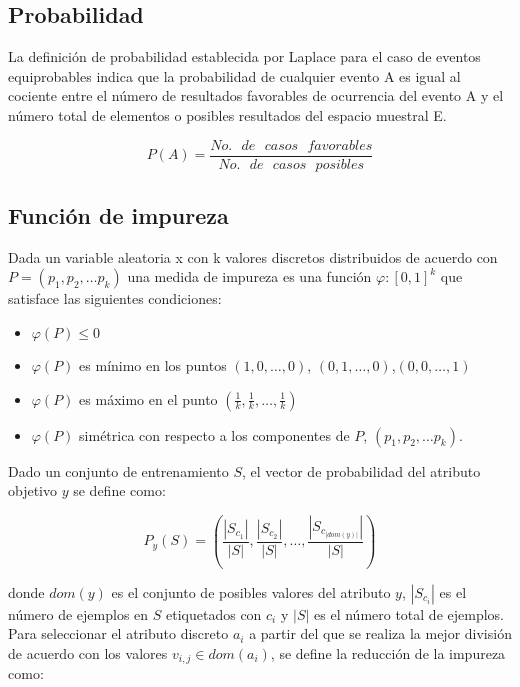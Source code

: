 \documentclass[
10pt, %
a4paper, %
]{article}
\begin{document}
\subsection{Probabilidad}

La definición de probabilidad establecida por Laplace \cite{laplace} para el caso de eventos equiprobables indica que la probabilidad de cualquier evento A es igual 
al cociente entre el número de resultados favorables de ocurrencia del evento A y el número total de elementos o posibles resultados del espacio muestral E.

\begin{equation*}
	P(A) = \dfrac{No.\mbox{ }de\mbox{ }casos\mbox{ }favorables}{No.\mbox{ }de\mbox{ }casos\mbox{ }posibles}
\end{equation*}

\subsection{Función de impureza}

Dada un variable aleatoria x con k valores discretos distribuidos de acuerdo con $P=\left(p_1,p_2,\ldots p_k\right)$ una medida de impureza es una función 
$\varphi:\left[0,1\right]^k$ que satisface las siguientes condiciones:
\begin{itemize}
	\item $\varphi(P) \leq 0$
	\item $\varphi(P)$ es mínimo en los puntos $(1,0,\dots,0)$, $(0,1,\dots, 0)$,$(0,0,\dots,1)$
	\item $\varphi(P)$ es máximo en el punto $\left(\frac{1}{k}, \frac{1}{k},\dots, \frac{1}{k}\right)$
	\item $\varphi(P)$ simétrica con respecto a los componentes de $P$, $\left(p_1,p_2,\ldots p_k\right)$.
\end{itemize}

Dado un conjunto de entrenamiento $S$, el vector de probabilidad del atributo objetivo $y$ se define como:

\begin{equation*}
P_y\left(S\right)=\left(\frac{\left|S_{c_1}\right|}{\left|S\right|},\frac{\left|S_{c_2}\right|}{\left|S\right|},\ldots,\frac{\left|S_{c_{\left|dom\left(y\right)\right|}}\right|}{\left|S\right|}\right)
\end{equation*}

donde $dom\left(y\right)$ es el conjunto de posibles valores del atributo $y$, $\left|S_{c_i}\right|$ es el número de ejemplos en $S$ etiquetados con $c_i$ y 
$\left|S\right|$ es el número total de ejemplos. Para seleccionar el atributo discreto $a_i$ a partir del que se realiza la mejor división de acuerdo con los 
valores $v_{i,j}\in dom\left(a_i\right)$, se define la reducción de la impureza como:
\end{document}
